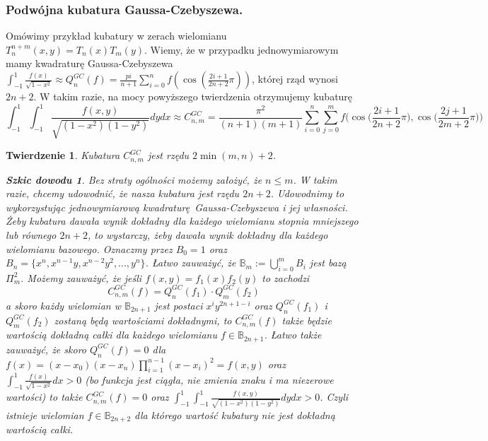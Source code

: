 \documentclass[10pt,wide]{mwart}
\newtheorem{tw}{Twierdzenie}
\theoremstyle{definition}
\newtheorem{szk}{Szkic dowodu}
\begin{document}
\subsubsection{Podwójna kubatura Gaussa-Czebyszewa.}
Omówimy przykład kubatury w zerach wielomianu \(T_n^{n+m}(x,y) = T_n(x)T_m(y)\).
Wiemy, że w przypadku jednowymiarowym mamy kwadraturę Gaussa-Czebyszewa \(\int_{-1}^{1} \frac{f(x)}{\sqrt{1-x^2}} \approx Q_n^{GC}(f) = \frac{pi}{n+1}\sum_{i=0}^{n}f(\cos(\frac{2i+1}{2n+2}\pi)) \), której rząd wynosi \(2n + 2\).
W takim razie, na mocy powyższego twierdzenia otrzymujemy kubaturę
\begin{equation*}
  \int_{-1}^1 \int_{-1}^1 \frac{f(x,y)}{\sqrt{(1-x^2)(1-y^2)}} dydx \approx C_{n,m}^{GC} = \frac{\pi^2}{(n+1)(m+1)}\sum_{i=0}^{n}\sum_{j=0}^{m}f\Bigg(\cos\Big(\frac{2i+1}{2n+2}\pi\Big), \cos\Big(\frac{2j+1}{2m+2}\pi\Big)\Bigg)
\end{equation*}
\begin{tw}
  Kubatura \(C_{n,m}^{GC}\) jest rzędu \(2\min(m,n) + 2\).
\begin{szk}
  Bez straty ogólności możemy założyć, że \(n \leq m\). W takim razie, chcemy udowodnić, że nasza kubatura jest rzędu \(2n+2\).
  Udowodnimy to wykorzystując jednowymiarową kwadraturę Gaussa-Czebyszewa i jej własności.
  Żeby kubatura dawała wynik dokładny dla każdego wielomianu stopnia mniejszego lub równego \(2n+2\), to wystarczy, żeby dawała wynik dokładny dla każdego wielomianu bazowego.
  Oznaczmy przez \(B_0 = {1}\) oraz \(B_n = \{x^{n}, x^{n-1}y, x^{n-2}y^2, ..., y^{n}\}\). Łatwo zauważyć, że \(\mathbb{B}_m := \bigcup_{i=0}^{m} B_i \) jest bazą \(\Pi_{m}^2\).
  Możemy zauważyć, że jeśli \(f(x,y) = f_1(x)f_2(y)\)
  to zachodzi
  \begin{equation*}
  C_{n,m}^{GC}(f) = Q_n^{GC}(f_1)\cdot Q_m^{GC}(f_2)
\end{equation*}
  a skoro każdy wielomian w \(\mathbb{B}_{2n+1}\) jest postaci \(x^iy^{2n+1-i}\) oraz \(Q_n^{GC}(f_1)\) i \(Q_m^{GC}(f_2)\) zostaną będą wartościami dokładnymi, to \(C_{n,m}^{GC}(f)\) także będzie wartością dokładną całki dla każdego wielomianu \(f \in \mathbb{B}_{2n+1}\).
  Łatwo także zauważyć, że skoro \(Q_n^{GC}(f) = 0\) dla \(f(x) = (x-x_0)(x-x_n)\prod_{i=1}^{n-1}(x-x_i)^2 = f(x,y)\) oraz \(\int_{-1}^1 \frac{f(x)}{\sqrt{1-x^2}} dx > 0\) (bo funkcja jest ciągła, nie zmienia znaku i ma niezerowe wartości) to także \(C_{n,m}^{GC}(f) = 0\) oraz \(\int_{-1}^1\int_{-1}^1 \frac{f(x,y)}{\sqrt{(1-x^2)(1-y^2)}} dy dx > 0\).
  Czyli istnieje wielomian \(f \in \mathbb{B}_{2n+2}\) dla którego wartość kubatury nie jest dokładną wartością całki.
\end{szk}
\end{tw}
\end{document}
